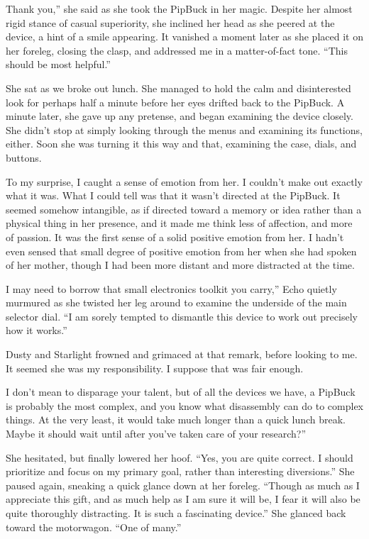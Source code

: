 \leavevmode{}Thank you,” she said as she took the PipBuck in her magic. Despite her almost rigid stance of casual superiority, she inclined her head as she peered at the device, a hint of a smile appearing. It vanished a moment later as she placed it on her foreleg, closing the clasp, and addressed me in a matter-of-fact tone. “This should be most helpful.”

She sat as we broke out lunch. She managed to hold the calm and disinterested look for perhaps half a minute before her eyes drifted back to the PipBuck. A minute later, she gave up any pretense, and began examining the device closely. She didn’t stop at simply looking through the menus and examining its functions, either. Soon she was turning it this way and that, examining the case, dials, and buttons.

To my surprise, I caught a sense of emotion from her. I couldn’t make out exactly what it was. What I could tell was that it wasn’t directed at the PipBuck. It seemed somehow intangible, as if directed toward a memory or idea rather than a physical thing in her presence, and it made me think less of affection, and more of passion. It was the first sense of a solid positive emotion from her. I hadn’t even sensed that small degree of positive emotion from her when she had spoken of her mother, though I had been more distant and more distracted at the time.

\leavevmode{}I may need to borrow that small electronics toolkit you carry,” Echo quietly murmured as she twisted her leg around to examine the underside of the main selector dial. “I am sorely tempted to dismantle this device to work out precisely how it works.”

Dusty and Starlight frowned and grimaced at that remark, before looking to me. It seemed she was my responsibility. I suppose that was fair enough.

\leavevmode{}I don’t mean to disparage your talent, but of all the devices we have, a PipBuck is probably the most complex, and you know what disassembly can do to complex things. At the very least, it would take much longer than a quick lunch break. Maybe it should wait until after you’ve taken care of your research?”

She hesitated, but finally lowered her hoof. “Yes, you are quite correct. I should prioritize and focus on my primary goal, rather than interesting diversions.” She paused again, sneaking a quick glance down at her foreleg. “Though as much as I appreciate this gift, and as much help as I am sure it will be, I fear it will also be quite thoroughly distracting. It is such a fascinating device.” She glanced back toward the motorwagon. “One of many.”

